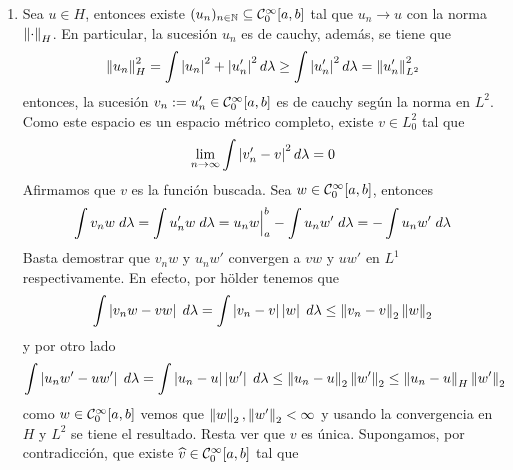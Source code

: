 \documentclass{article}
\begin{document}
\begin{enumerate}
    \item Sea $u\in H$, entonces existe $(u_{n})_{n\in\mathbb{N}}\subseteq \mathcal{C}_{0}^{\infty}[a,b]$ tal que
    $u_{n}\to u$ con la norma $\left \lVert \cdot\right \rVert_{H}$. En particular, la sucesión $u_{n}$ es de cauchy,
    además, se tiene que
    \begin{equation*}
        \left \lVert u_{n}\right \rVert_{H}^{2}=\int\left|u_{n} \right|^{2}+\left|u_{n}' \right|^{2}d\lambda
        \geq\int\left|u_{n}' \right|^{2}d\lambda=\left \lVert u_{n}'\right \rVert_{L^{2}}^{2}
    \end{equation*}
    entonces, la sucesión $v_{n}:=u_{n}'\in\mathcal{C}_{0}^{\infty}[a,b]$ es de cauchy según la norma en 
    $L^{2}$. Como este espacio es un espacio métrico completo, existe $v\in L_{0}^{2}$ tal que
    \begin{equation*}
        \lim\limits_{n\to\infty}\int\left|v'_{n}-v \right|^{2}d\lambda=0
    \end{equation*}
    Afirmamos que $v$ es la función buscada. Sea $w\in\mathcal{C}_{0}^{\infty}[a,b]$, entonces
    \begin{equation*}
        \int v_{n}w\hspace{1mm}d\lambda=\int u_{n}'w\hspace{1mm}d\lambda=u_{n}w\Big|_{a}^{b}
        -\int u_{n}w'\hspace{1mm}d\lambda=-\int u_{n}w'\hspace{1mm}d\lambda
    \end{equation*}
    Basta demostrar que $v_{n}w$ y $u_{n}w'$ convergen a $vw$ y $uw'$ en $L^{1}$ respectivamente.
    En efecto, por hölder tenemos que
    \begin{equation*}
        \int\left|v_{n}w-vw \right|\hspace{1mm}d\lambda=\int\left|v_{n}-v \right|\left|w \right|\hspace{1mm}d\lambda
        \leq\left \lVert v_{n}-v\right \rVert_{2}\left \lVert w\right \rVert_{2}
    \end{equation*}
    y por otro lado
    \begin{equation*}
        \int\left|u_{n}w'-uw' \right|\hspace{1mm}d\lambda=\int\left|u_{n}-u \right|\left|w' \right|\hspace{1mm}d\lambda
        \leq\left \lVert u_{n}-u\right \rVert_{2}\left \lVert w'\right \rVert_{2}\leq\left \lVert u_{n}-u\right \rVert_{H}\left \lVert w'\right \rVert_{2}
    \end{equation*}
    como $w\in\mathcal{C}_{0}^{\infty}[a,b]$ vemos que $\left \lVert w\right \rVert_{2},\left \lVert w'\right \rVert_{2}<\infty$ y usando la 
    convergencia en $H$ y $L^{2}$ se tiene el resultado. Resta ver que $v$ es única. Supongamos, 
    por contradicción, que existe $\widehat{v}\in\mathcal{C}_{0}^{\infty}[a,b]$ tal que
    \begin{equation*}

\end{equation*}
\end{enumerate}
\end{document}
